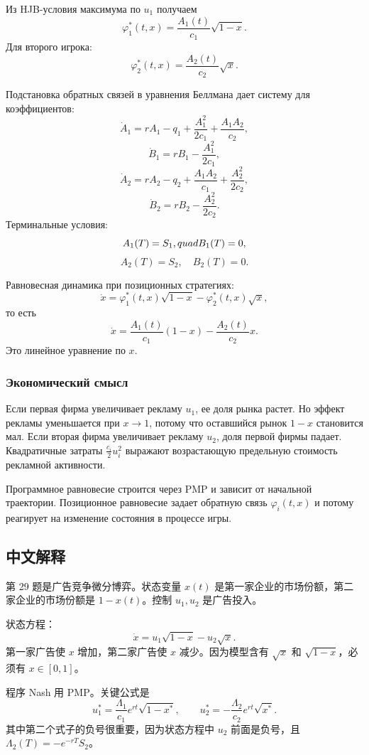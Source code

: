 \documentclass[12pt,a4paper]{article}
\begin{document}
Из HJB-условия максимума по $u_1$ получаем
\[
 \varphi_1^*(t,x)=\frac{A_1(t)}{c_1}\sqrt{1-x}.
\]
Для второго игрока:
\[
 \varphi_2^*(t,x)=\frac{A_2(t)}{c_2}\sqrt{x}.
\]

Подстановка обратных связей в уравнения Беллмана дает систему для коэффициентов:
\[
 \dot A_1=rA_1-q_1+\frac{A_1^2}{2c_1}+\frac{A_1A_2}{c_2},
\]
\[
 \dot B_1=rB_1-\frac{A_1^2}{2c_1},
\]
\[
 \dot A_2=rA_2-q_2+\frac{A_1A_2}{c_1}+\frac{A_2^2}{2c_2},
\]
\[
 \dot B_2=rB_2-\frac{A_2^2}{2c_2}.
\]
Терминальные условия:
\[
 A_1(T)=S_1,\\quad B_1(T)=0,
\]
\[
 A_2(T)=S_2,
\quad B_2(T)=0.
\]

Равновесная динамика при позиционных стратегиях:
\[
 \dot x=\varphi_1^*(t,x)\sqrt{1-x}-\varphi_2^*(t,x)\sqrt{x},
\]
то есть
\[
 \dot x=\frac{A_1(t)}{c_1}(1-x)-\frac{A_2(t)}{c_2}x.
\]
Это линейное уравнение по $x$.

\subsubsection{Экономический смысл}

Если первая фирма увеличивает рекламу $u_1$, ее доля рынка растет. Но эффект рекламы уменьшается при $x\to1$, потому что оставшийся рынок $1-x$ становится мал. Если вторая фирма увеличивает рекламу $u_2$, доля первой фирмы падает. Квадратичные затраты $\frac{c_i}{2}u_i^2$ выражают возрастающую предельную стоимость рекламной активности.

Программное равновесие строится через PMP и зависит от начальной траектории. Позиционное равновесие задает обратную связь $\varphi_i(t,x)$ и потому реагирует на изменение состояния в процессе игры.

\subsection{中文解释}

第 29 题是广告竞争微分博弈。状态变量 $x(t)$ 是第一家企业的市场份额，第二家企业的市场份额是 $1-x(t)$。控制 $u_1,u_2$ 是广告投入。

状态方程：
\[
 \dot x=u_1\sqrt{1-x}-u_2\sqrt{x}.
\]
第一家广告使 $x$ 增加，第二家广告使 $x$ 减少。因为模型含有 $\sqrt{x}$ 和 $\sqrt{1-x}$，必须有 $x\in[0,1]$。

程序 Nash 用 PMP。关键公式是
\[
 u_1^*=\frac{\Lambda_1}{c_1}e^{rt}\sqrt{1-x^*},\qquad
 u_2^*=-\frac{\Lambda_2}{c_2}e^{rt}\sqrt{x^*}.
\]
其中第二个式子的负号很重要，因为状态方程中 $u_2$ 前面是负号，且 $\Lambda_2(T)=-e^{-rT}S_2$。
\end{document}
